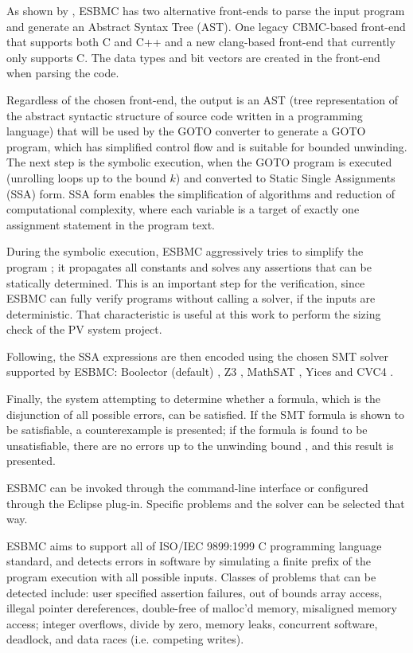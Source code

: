 \documentclass[journal]{IEEEtran}
\begin{document}
As shown by \cite{GadelhaSBMF}, ESBMC has two alternative front-ends to parse the input program and generate an Abstract Syntax Tree (AST). One legacy CBMC-based front-end that supports both C and C++ and a new clang-based front-end that currently only supports C. The data types and bit vectors are created in the front-end when parsing the code. 

Regardless of the chosen front-end, the output is an AST (tree representation of the abstract syntactic structure of source code written in a programming language) that will be used by the GOTO converter to generate a GOTO program, which has simplified control flow and is suitable for bounded unwinding. The next step is the symbolic execution, when the GOTO program is executed (unrolling loops up to the bound $ k $) and converted to Static Single Assignments (SSA) form. SSA form enables the simplification of algorithms and reduction of computational complexity, where each variable is a target of exactly one assignment statement in the program text. 

During the symbolic execution, ESBMC aggressively tries to simplify the program \cite{Ramalho}; it propagates all constants and solves any assertions that can be statically determined. This is an important step for the verification, since ESBMC can fully verify programs without calling a solver, if the inputs are deterministic. That characteristic is useful at this work to perform the sizing check of the PV system project. 

Following, the SSA expressions are then encoded using the chosen SMT solver supported by ESBMC: Boolector (default) \cite{Brummayer}, Z3 \cite{DeMoura}, MathSAT \cite{Cimatti}, Yices \cite{Dutertre} and CVC4 \cite{Barrett}. 

Finally, the system attempting to determine whether a formula, which is the disjunction of all possible errors, can be satisfied. If the SMT formula is shown to be satisfiable, a counterexample is presented; if the formula is found to be unsatisfiable, there are no errors up to the unwinding bound , and this result is presented. 
 
ESBMC can be invoked through the command-line interface or configured through the Eclipse plug-in. Specific problems and the solver can be selected that way. 

ESBMC aims to support all of ISO/IEC 9899:1999 C programming language standard, and detects errors in software by simulating a finite prefix of the program execution with all possible inputs. Classes of problems that can be detected include: user specified assertion failures, out of bounds array access, illegal pointer dereferences, double-free of malloc'd memory, misaligned memory access; integer overflows, divide by zero, memory leaks, concurrent software, deadlock, and data races (i.e. competing writes). 
 
\end{document}
